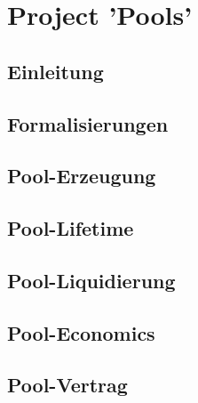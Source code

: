
\section{Project 'Pools'}
\label{sec:pools}

\subsection{Einleitung}
\label{sec:pools-einleitung}
\vspace{0.3cm}


\subsection{Formalisierungen}
\vspace{0.3cm}


\subsection{Pool-Erzeugung}
\vspace{0.3cm}


\subsection{Pool-Lifetime}
\vspace{0.3cm}


\subsection{Pool-Liquidierung}
\vspace{0.3cm}


\subsection{Pool-Economics}
\vspace{0.3cm}



\subsection{Pool-Vertrag}
\vspace{0.3cm}


